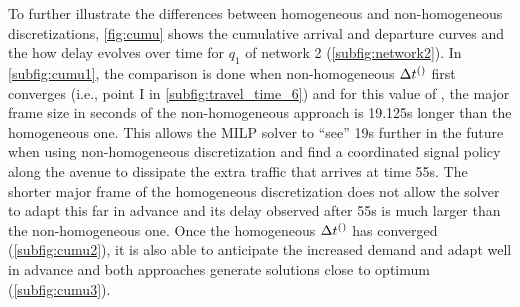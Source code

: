 To further illustrate the differences between homogeneous and non-homogeneous
discretizations, \cref{fig:cumu} shows the cumulative arrival and departure
curves and the how delay evolves over time for $q_1$ of network 2
(\cref{subfig:network2}).
%
In \cref{subfig:cumu1}, the comparison is done when non-homogeneous $\DT[]$
first converges (i.e., point I in \cref{subfig:travel_time_6}) and for this
value of \Nn, the major frame size in seconds of the non-homogeneous approach is
19.125s longer than the homogeneous one.
%
This allows the MILP solver to ``see'' 19s further in the future when using
non-homogeneous discretization and find a coordinated signal policy along the
avenue to dissipate the extra traffic that arrives at time 55s.
%
The shorter major frame of the homogeneous discretization does not allow the
solver to adapt this far in advance and its delay observed after 55s is much
larger than the non-homogeneous one.
%
Once the homogeneous $\DT[]$ has converged (\cref{subfig:cumu2}), it is also
able to anticipate the increased demand and adapt well in advance and both
approaches generate solutions close to optimum (\cref{subfig:cumu3}).
